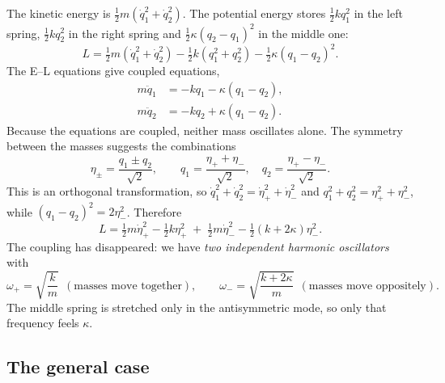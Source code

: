 \documentclass[11pt]{article}
\begin{document}
The kinetic energy is $\tfrac12m(\dot q_1^2+\dot q_2^2)$. The potential energy stores $\tfrac12kq_1^2$ in the left spring, $\tfrac12kq_2^2$ in the right spring and $\tfrac12\kappa(q_2-q_1)^2$ in the middle one:
\begin{equation}
  L=\tfrac12m(\dot q_1^2+\dot q_2^2)-\tfrac12k(q_1^2+q_2^2)-\tfrac12\kappa(q_1-q_2)^2 .
\end{equation}
The E--L equations give coupled equations,
\begin{align}
  m\ddot q_1&=-kq_1-\kappa(q_1-q_2),\\
  m\ddot q_2&=-kq_2+\kappa(q_1-q_2).
\end{align}
Because the equations are coupled, neither mass oscillates alone. The symmetry between the masses suggests the combinations
\begin{equation}
  \eta_\pm=\frac{q_1\pm q_2}{\sqrt2},\qquad q_1=\frac{\eta_++\eta_-}{\sqrt2},\quad q_2=\frac{\eta_+-\eta_-}{\sqrt2}.
\end{equation}
This is an orthogonal transformation, so $\dot q_1^2+\dot q_2^2=\dot\eta_+^2+\dot\eta_-^2$ and $q_1^2+q_2^2=\eta_+^2+\eta_-^2$, while $(q_1-q_2)^2=2\eta_-^2$. Therefore
\begin{equation}
  L=\tfrac12m\dot\eta_+^2-\tfrac12k\eta_+^2\;+\;\tfrac12m\dot\eta_-^2-\tfrac12(k+2\kappa)\eta_-^2 .
\end{equation}
The coupling has disappeared: we have \emph{two independent harmonic oscillators} with
\begin{equation}
  \omega_+=\sqrt{\frac km}\ \ (\text{masses move together}),\qquad \omega_-=\sqrt{\frac{k+2\kappa}m}\ \ (\text{masses move oppositely}).
\end{equation}
The middle spring is stretched only in the antisymmetric mode, so only that frequency feels $\kappa$.

\subsection{The general case}
\end{document}
